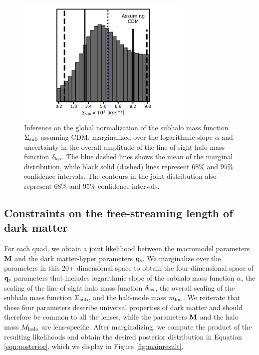 \begin{figure}
	\centering
	\includegraphics[clip,trim=3cm 0.3cm 3cm
	0cm,width=0.75\textwidth,keepaspectratio]{./figures_wdmchillsout/CDM_joint.pdf}
	\caption[Posterior distribution of the normalization of the SHMF assuming CDM]{\label{fig:cdmsigmasub} Inference on the global normalization of the subhalo mass function $\Sigma_{\rm{sub}}$ assuming CDM, marginalized over the logarithmic slope $\alpha$ and uncertainty in the overall amplitude of the line of sight halo mass function $\delta_{\rm{los}}$. The blue dashed lines shows the mean of the marginal distribution, while black solid (dashed) lines represent $68\%$ and $95 \%$ confidence intervals. The contours in the joint distribution also represent $68\%$ and $95 \%$ confidence intervals.}
\end{figure}	

\subsection{Constraints on the free-streaming length of dark matter}
\label{ssec:mainresults}
For each quad, we obtain a joint likelihood between the macromodel parameters ${\bf{M}}$ and the dark matter-hyper parameters ${\bf{q}_{\rm{s}}}$. We marginalize over the parameters in this 20+ dimensional space to obtain the four-dimensional space of ${\bf{q}_{\rm{s}}}$ parameters that includes logarithmic slope of the subhalo mass function $\alpha$, the scaling of the line of sight halo mass function $\delta_{\rm{los}}$, the overall scaling of the subhalo mass function $\Sigma_{\rm{sub}}$, and the half-mode mass ${m_{\rm{hm}}}$. We reiterate that these four parameters describe universal properties of dark matter and should therefore be common to all the lenses, while the parameters ${\bf{M}}$ and the halo mass $M_{\rm{halo}}$ are lens-specific. After marginalizing, we compute the product of the resulting likelihoods and obtain the desired posterior distribution in Equation \ref{eqn:posterior}, which we display in Figure \ref{fig:mainresult}.

